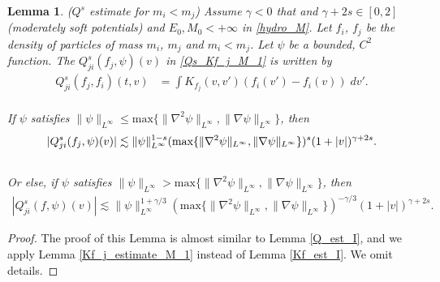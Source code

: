 \documentclass[reqno,10pt]{amsart}
\newtheorem{lemma}[theorem]{Lemma}
\numberwithin{equation}{section}
\begin{document}
\begin{lemma} ($Q^s$ estimate for $m_i<m_j$) \label{Q_est_M_1}
Assume $\gamma<0$ that and $\gamma+2s \in [0,2]$(moderately soft potentials) and $E_0,M_0<+\infty$ in \eqref{hydro_M}. Let $f_i$, $f_j$ be the density of particles of mass $m_i$, $m_j$ and $m_i<m_j$. Let $\psi$ be a bounded, $C^2$ function. The $Q^{s}_{ji}(f_j,\psi)(v)$ in \eqref{Qs_Kf_j_M_1} is written by
\begin{align*}
Q^{s}_{ji}(f_j,f_i)(t,v) &= \int K_{f_j}(v,v')(f_i(v')-f_i(v)) \;dv'. 
\end{align*}\\
\noindent If $\psi$ satisfies $\|\psi\|_{L^{\infty}} \leq \text{max} \{\|\nabla^2 \psi\|_{L^\infty}, \|\nabla\psi\|_{L^\infty} \}$, then
\begin{align} \label{Q_est_1_M_1}
     |Q_{ji}^{s}(f_j,\psi)(v)| 
    \lesssim
  \|\psi\|_{L^{\infty}}^{1-s}(\text{max}\{\|\nabla^2 \psi\|_{L^\infty}, \|\nabla \psi\|_{L^\infty} \})^{s}(1+|v|)^{\gamma+2s}. \\ \notag
\end{align} 
Or else, if $\psi$ satisfies $\|\psi\|_{L^{\infty}} > \text{max} \{\|\nabla^2 \psi\|_{L^\infty}, \|\nabla\psi\|_{L^\infty} \}$, then
\begin{align*}
     |Q^{s}_{ji}(f,\psi)(v)| 
    \lesssim
    \|\psi\|_{L^{\infty}}^{1+\gamma/3}(\text{max}\{\|\nabla^2 \psi\|_{L^\infty}, \|\nabla \psi\|_{L^\infty} \})^{-\gamma/3}(1+|v|)^{\gamma+2s}.
\end{align*}
\end{lemma}
\begin{proof}  
The proof of this Lemma is almost similar to Lemma \ref{Q_est_I}, and we apply Lemma \ref{Kf_j_estimate_M_1} instead of Lemma \ref{Kf_est_I}. We omit details.
\end{proof} \vspace{3mm}
\end{document}
